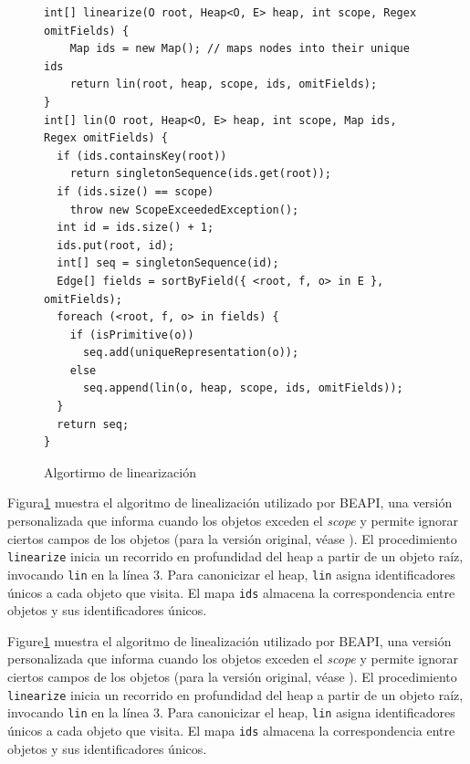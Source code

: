 \begin{figure}[!th]
\begin{lstlisting}
int[] linearize(O root, Heap<O, E> heap, int scope, Regex omitFields) {
    Map ids = new Map(); // maps nodes into their unique ids 
    return lin(root, heap, scope, ids, omitFields); 
}
int[] lin(O root, Heap<O, E> heap, int scope, Map ids, Regex omitFields) { 
  if (ids.containsKey(root))
    return singletonSequence(ids.get(root)); 
  if (ids.size() == scope) 
    throw new ScopeExceededException();
  int id = ids.size() + 1;
  ids.put(root, id);
  int[] seq = singletonSequence(id);
  Edge[] fields = sortByField({ <root, f, o> in E }, omitFields); 
  foreach (<root, f, o> in fields) {
    if (isPrimitive(o)) 
      seq.add(uniqueRepresentation(o));
    else
      seq.append(lin(o, heap, scope, ids, omitFields));
  }
  return seq; 
}
\end{lstlisting}
\caption{Algortirmo de linearización }
\label{alg:linearization}
\end{figure}


Figura\ref{alg:linearization} muestra el algoritmo de linealización utilizado por \textsf{BEAPI}, una versión personalizada que 
informa cuando los objetos exceden el \emph{scope} y permite ignorar ciertos campos de los objetos (para la versión original, véase 
\cite{Xie04}). El procedimiento \texttt{linearize} inicia un recorrido en profundidad del heap a partir de un objeto raíz, invocando 
\texttt{lin} en la línea 3. Para canonicizar el heap, \texttt{lin} asigna identificadores únicos a cada objeto que visita. El mapa 
\texttt{ids} almacena la correspondencia entre objetos y sus identificadores únicos.

Figure\ref{alg:linearization} muestra el algoritmo de linealización utilizado por \textsf{BEAPI}, una versión personalizada que 
informa cuando los objetos exceden el \emph{scope} y permite ignorar ciertos campos de los objetos (para la versión original, véase 
\cite{Xie04}). El procedimiento \texttt{linearize} inicia un recorrido en profundidad del heap a partir de un objeto raíz, invocando 
\texttt{lin} en la línea 3. Para canonicizar el heap, \texttt{lin} asigna identificadores únicos a cada objeto que visita. El mapa 
\texttt{ids} almacena la correspondencia entre objetos y sus identificadores únicos.

